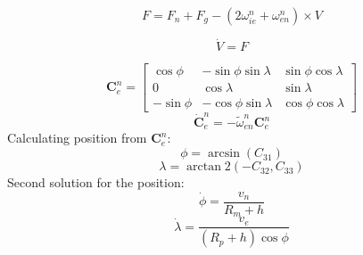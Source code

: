 \[
    F = F_n + F_g - (2\omega_{ie}^n + \omega_{en}^n) \times V
\]

\[
    \dot{V} = F
\]

\[
    \bm{C}_e^n = \begin{bmatrix}
        \cos\phi & -\sin\phi\sin\lambda & \sin\phi\cos\lambda \\
        0 & \cos\lambda & \sin\lambda \\
        -\sin\phi & -\cos\phi\sin\lambda & \cos\phi\cos\lambda
    \end{bmatrix}
\]
\[
    \dot{\bm{C}}_e^n = -\tilde{\omega}_{en}^n\bm{C}_e^n
\]
Calculating position from $\bm{C}_e^n$:
\[
    \phi = \arcsin(C_{31})
\]
\[
    \lambda = \arctan2(-C_{32}, C_{33})
\]
Second solution for the position:
\[
    \dot{\phi} = \dfrac{v_n}{R_m+h}
\]
\[
    \dot{\lambda} = \dfrac{v_e}{(R_p+h)\cos\phi}
\]

